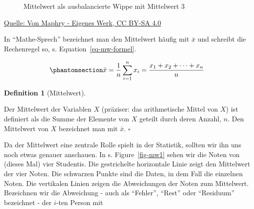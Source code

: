 \documentclass[
  letterpaper,
  DIV=11,
  numbers=noendperiod]{scrartcl}
\theoremstyle{definition}
\theoremstyle{definition}
\theoremstyle{definition}
\newtheorem{definition}{Definition}[section]
\theoremstyle{remark}
\begin{document}
\begin{figure}


\caption{\label{fig-wippe}Mittelwert als ausbalancierte Wippe mit
Mittelwert 3}

\end{figure}%

\href{https://commons.wikimedia.org/w/index.php?curid=79390659}{Quelle:
Von Maphry - Eigenes Werk, CC BY-SA 4.0}

In ``Mathe-Sprech'' bezeichnet man den Mittelwert häufig mit \(\bar{x}\)
und schreibt die Rechenregel so, s. Equation~\ref{eq-mw-formel}.

\begin{equation}\phantomsection\label{eq-mw-formel}{\bar {x} =\frac{1}{n} \sum_{i=1}^{n}{x_{i}}=\frac {x_{1}+x_{2}+\dotsb +x_{n}} {n}}\end{equation}

\begin{definition}[Mittelwert]\protect\hypertarget{def-mw}{}\label{def-mw}

Der Mittelwert der Variablen \(X\) (präziser: das arithmetische Mittel
von \(X\)) ist definiert als die Summe der Elemente von \(X\) geteilt
durch deren Anzahl, \(n\). Den Mittelwert von \(X\) bezeichnet man mit
\(\bar {x}\). \(\square\)

\end{definition}

Da der Mittelwert eine zentrale Rolle spielt in der Statistik, sollten
wir ihn uns noch etwas genauer anschauen. In s. Figure~\ref{fig-mw1}
sehen wir die Noten von (dieses Mal) vier Studentis. Die gestrichelte
horizontale Linie zeigt den Mittelwert der vier Noten. Die schwarzen
Punkte sind die Daten, in dem Fall die einzelnen Noten. Die vertikalen
Linien zeigen die Abweichungen der Noten zum Mittelwert. Bezeichnen wir
die Abweichung - auch als ``Fehler'', ``Rest'' oder ``Residuum''
bezeichnet - der \(i\)-ten Person mit
\end{document}
